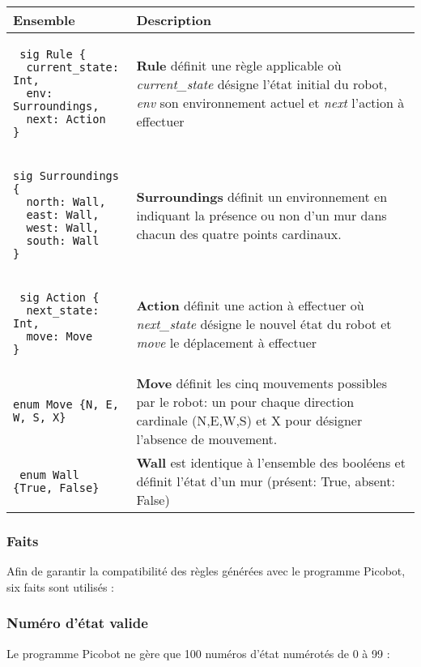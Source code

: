 \documentclass{article}
\begin{document}
\begin{tabular}{|l|M{8cm}|}
    \hline
    \textbf{Ensemble} & \textbf{Description} \tabularnewline
    \hline
    \begin{lstlisting}
 sig Rule {
  current_state: Int,
  env: Surroundings,
  next: Action
}
\end{lstlisting} & \textbf{Rule} définit une règle applicable où \textit{current\_state} désigne l'état initial du robot, \textit{env} son environnement actuel et \textit{next} l'action à effectuer \tabularnewline
    \hline
    \begin{lstlisting}
sig Surroundings {
  north: Wall,
  east: Wall,
  west: Wall,
  south: Wall
}
\end{lstlisting} & \textbf{Surroundings} définit un environnement en indiquant la présence ou non d'un mur dans chacun des quatre points cardinaux.
\tabularnewline
    \hline
    \begin{lstlisting}
 sig Action {
  next_state: Int,
  move: Move
}
\end{lstlisting} & \textbf{Action} définit une action à effectuer où \textit{next\_state} désigne le nouvel état du robot et \textit{move} le déplacement à effectuer\tabularnewline
    \hline
    \begin{lstlisting}
enum Move {N, E, W, S, X}
\end{lstlisting} & \textbf{Move} définit les cinq mouvements possibles par le robot: un pour chaque direction cardinale (N,E,W,S) et X pour désigner l’absence de mouvement.
\tabularnewline
    \hline
    \begin{lstlisting}
 enum Wall {True, False}
\end{lstlisting} & \textbf{Wall} est identique à l’ensemble des booléens et définit l’état d’un mur (présent: True, absent: False)\tabularnewline
    \hline

 \end{tabular}

\subsubsection{Faits}
Afin de garantir la compatibilité des règles générées avec le programme Picobot, six faits sont utilisés : 


\subsubsection*{Numéro d’état valide}
 Le programme Picobot ne gère que 100 numéros d’état numérotés de 0 à 99 :
\end{document}
